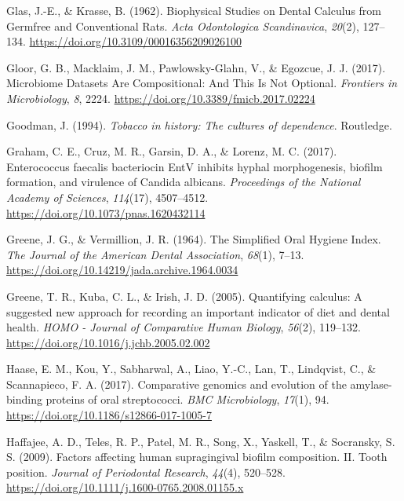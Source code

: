 \documentclass[
  letterpaper,
]{book}
\newlength{\cslhangindent}
\newlength{\cslentryspacingunit} %
\newenvironment{CSLReferences}[2] %
 {%
  \setlength{\parindent}{0pt}
  \ifodd #1
  \let\oldpar\par
  \def\par{\hangindent=\cslhangindent\oldpar}
  \fi
  \setlength{\parskip}{#2\cslentryspacingunit}
 }%
 {}
\begin{document}
\begin{CSLReferences}{1}{0}
\leavevmode{}%
Glas, J.-E., \& Krasse, B. (1962). Biophysical {Studies} on {Dental
Calculus} from {Germfree} and {Conventional Rats}. \emph{Acta
Odontologica Scandinavica}, \emph{20}(2), 127--134.
\url{https://doi.org/10.3109/00016356209026100}

\leavevmode{}%
Gloor, G. B., Macklaim, J. M., Pawlowsky-Glahn, V., \& Egozcue, J. J.
(2017). Microbiome {Datasets Are Compositional}: {And This Is Not
Optional}. \emph{Frontiers in Microbiology}, \emph{8}, 2224.
\url{https://doi.org/10.3389/fmicb.2017.02224}

\leavevmode{}%
Goodman, J. (1994). \emph{Tobacco in history: The cultures of
dependence}. {Routledge}.

\leavevmode{}%
Graham, C. E., Cruz, M. R., Garsin, D. A., \& Lorenz, M. C. (2017).
Enterococcus faecalis bacteriocin {EntV} inhibits hyphal morphogenesis,
biofilm formation, and virulence of {Candida} albicans.
\emph{Proceedings of the National Academy of Sciences}, \emph{114}(17),
4507--4512. \url{https://doi.org/10.1073/pnas.1620432114}

\leavevmode{}%
Greene, J. G., \& Vermillion, J. R. (1964). The {Simplified Oral Hygiene
Index}. \emph{The Journal of the American Dental Association},
\emph{68}(1), 7--13.
\url{https://doi.org/10.14219/jada.archive.1964.0034}

\leavevmode{}%
Greene, T. R., Kuba, C. L., \& Irish, J. D. (2005). Quantifying
calculus: {A} suggested new approach for recording an important
indicator of diet and dental health. \emph{HOMO - Journal of Comparative
Human Biology}, \emph{56}(2), 119--132.
\url{https://doi.org/10.1016/j.jchb.2005.02.002}

\leavevmode{}%
Haase, E. M., Kou, Y., Sabharwal, A., Liao, Y.-C., Lan, T., Lindqvist,
C., \& Scannapieco, F. A. (2017). Comparative genomics and evolution of
the amylase-binding proteins of oral streptococci. \emph{BMC
Microbiology}, \emph{17}(1), 94.
\url{https://doi.org/10.1186/s12866-017-1005-7}

\leavevmode{}%
Haffajee, A. D., Teles, R. P., Patel, M. R., Song, X., Yaskell, T., \&
Socransky, S. S. (2009). Factors affecting human supragingival biofilm
composition. {II}. {Tooth} position. \emph{Journal of Periodontal
Research}, \emph{44}(4), 520--528.
\url{https://doi.org/10.1111/j.1600-0765.2008.01155.x}


\end{CSLReferences}
\end{document}
